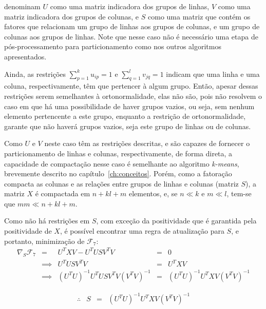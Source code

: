 \documentclass[
    12pt,                %
    oneside,            %
    a4paper,            %
    english,            %
    brazil                %
    ]{abntex2ppgsi}
\begin{document}
 denominam $U$ como uma matriz indicadora dos grupos de linhas, $V$ como uma matriz indicadora dos grupos de colunas, e $S$ como uma matriz que contém os fatores que relacionam um grupo de linhas aos grupos de colunas, e um grupo de colunas aos grupos de linhas.
Note que nesse caso não é necessário uma etapa de pós-processamento para particionamento como nos outros algoritmos apresentados.

Ainda, as restrições $\sum_{p=1}^{k} u_{ip} = 1$ e $\sum_{q=1}^{l} v_{jq} = 1$ indicam que uma linha e uma coluna, respectivamente, têm que pertencer à algum grupo.
Então, apesar dessas restrições serem semelhantes à ortonormalidade, elas não são, pois não resolvem o caso em que há uma possibilidade de haver grupos vazios, ou seja, sem nenhum elemento pertencente a este grupo, enquanto a restrição de ortonormalidade, garante que não haverá grupos vazios, seja este grupo de linhas ou de colunas.

Como $U$ e $V$ neste caso têm as restrições descritas, e são capazes de fornecer o particionamento de linhas e colunas, respectivamente, de forma direta, a capacidade de compactação nesse caso é semelhante ao algoritmo \textit{k-means}, brevemente descrito no capítulo~\ref{ch:conceitos}.
Porém, como a fatoração compacta as colunas e as relações entre grupos de linhas e colunas (matriz $S$), a matriz $X$ é compactada em $n + kl + m$ elementos, e, se $n \ll k$ e $m \ll l$, tem-se que $mm \ll n + kl + m$.

Como não há restrições em $S$, com exceção da positividade que é garantida pela positividade de $X$, é possível encontrar uma regra de atualização para $S$, e portanto, minimização de $\mathcal{F}_7$:
\[
    \begin{array}{lclcl}
        \nabla_S \mathcal{F}_7 &     =    & U^T X V - U^T U S V^T V                     & = & 0                             \\
                               & \implies & U^T U S V^T V                               & = & U^T X V                       \\
                               & \implies & (U^T U)^{-1} U^T U S V^T V (V^T V)^{-1} & = & (U^T U)^{-1} U^T X V (V^T V)^{-1}
    \end{array}   \nonumber
\]

\begin{equation}
\label{eq:fnmtf:updateS}
\begin{array}{lclcl}
\therefore & S & = & (U^T U)^{-1} U^T X V (V^T V)^{-1}    \nonumber
\end{array}
\end{equation}
\end{document}
